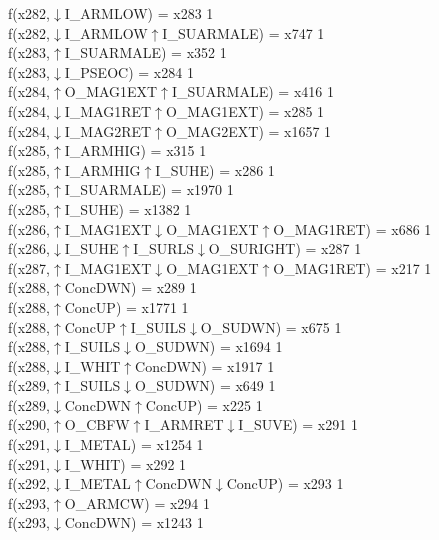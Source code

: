 f(x282,$\downarrow$I\_ARMLOW) = x283 {1} \\
f(x282,$\downarrow$I\_ARMLOW$\uparrow$I\_SUARMALE) = x747 {1} \\
f(x283,$\uparrow$I\_SUARMALE) = x352 {1} \\
f(x283,$\downarrow$I\_PSEOC) = x284 {1} \\
f(x284,$\uparrow$O\_MAG1EXT$\uparrow$I\_SUARMALE) = x416 {1} \\
f(x284,$\downarrow$I\_MAG1RET$\uparrow$O\_MAG1EXT) = x285 {1} \\
f(x284,$\downarrow$I\_MAG2RET$\uparrow$O\_MAG2EXT) = x1657 {1} \\
f(x285,$\uparrow$I\_ARMHIG) = x315 {1} \\
f(x285,$\uparrow$I\_ARMHIG$\uparrow$I\_SUHE) = x286 {1} \\
f(x285,$\uparrow$I\_SUARMALE) = x1970 {1} \\
f(x285,$\uparrow$I\_SUHE) = x1382 {1} \\
f(x286,$\uparrow$I\_MAG1EXT$\downarrow$O\_MAG1EXT$\uparrow$O\_MAG1RET) = x686 {1} \\
f(x286,$\downarrow$I\_SUHE$\uparrow$I\_SURLS$\downarrow$O\_SURIGHT) = x287 {1} \\
f(x287,$\uparrow$I\_MAG1EXT$\downarrow$O\_MAG1EXT$\uparrow$O\_MAG1RET) = x217 {1} \\
f(x288,$\uparrow$ConcDWN) = x289 {1} \\
f(x288,$\uparrow$ConcUP) = x1771 {1} \\
f(x288,$\uparrow$ConcUP$\uparrow$I\_SUILS$\downarrow$O\_SUDWN) = x675 {1} \\
f(x288,$\uparrow$I\_SUILS$\downarrow$O\_SUDWN) = x1694 {1} \\
f(x288,$\downarrow$I\_WHIT$\uparrow$ConcDWN) = x1917 {1} \\
f(x289,$\uparrow$I\_SUILS$\downarrow$O\_SUDWN) = x649 {1} \\
f(x289,$\downarrow$ConcDWN$\uparrow$ConcUP) = x225 {1} \\
f(x290,$\uparrow$O\_CBFW$\uparrow$I\_ARMRET$\downarrow$I\_SUVE) = x291 {1} \\
f(x291,$\downarrow$I\_METAL) = x1254 {1} \\
f(x291,$\downarrow$I\_WHIT) = x292 {1} \\
f(x292,$\downarrow$I\_METAL$\uparrow$ConcDWN$\downarrow$ConcUP) = x293 {1} \\
f(x293,$\uparrow$O\_ARMCW) = x294 {1} \\
f(x293,$\downarrow$ConcDWN) = x1243 {1} \\

